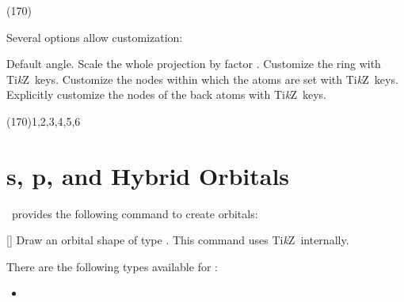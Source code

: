 \documentclass[load-preamble+]{cnltx-doc}
\newcommand*\TikZ{Ti\textit{k}Z}
\begin{document}
\begin{example}
  \newman{} \newman(170){}
    
\end{example}

Several options allow customization:
\begin{options}
    Default angle.
    Scale the whole projection by factor .
  \Default
    Customize the ring with \TikZ\ keys.
  \Default
    Customize the nodes within which the atoms are set with \TikZ\ keys.
  \Default
    Explicitly customize the nodes of the back atoms with \TikZ\ keys.
\end{options}

\begin{example}
   \newman{}
  \newman[scale=.75,ring={draw=blue,fill=blue!20}]{}
\end{example}

\begin{example}
\end{example}

\begin{example}
   \newman(170){1,2,3,4,5,6}
\end{example}

\section{s, p, and Hybrid Orbitals}\label{sec:orbitale}

\chemmacros\ provides the following command to create orbitals:
\begin{commands}
  []
    Draw an orbital shape of type .  This command uses \TikZ\
    internally.
\end{commands}

There are the following types available for :
\begin{itemize}
  \item[]
     \quad
     \quad
     \quad
     \quad
\end{itemize}
\end{document}
